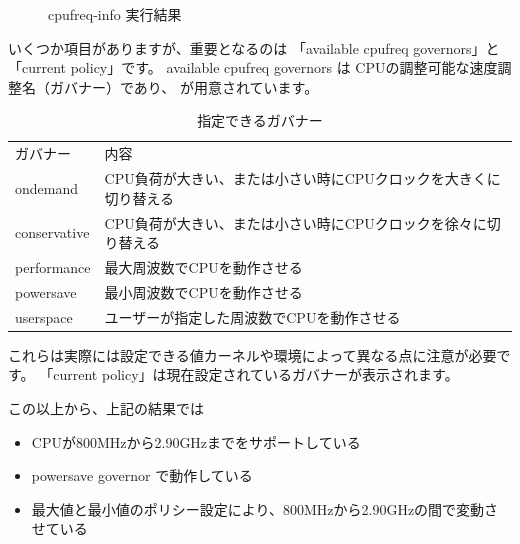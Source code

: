 \documentclass[mingoth,a4paper]{jsarticle}
\begin{document}
\begin{figure}[htbp]

\caption{cpufreq-info 実行結果}
\label{fig:cpufreq-info}
\end{figure}

いくつか項目がありますが、重要となるのは 「available cpufreq governors」と
「current policy」です。
available cpufreq governors は CPUの調整可能な速度調整名（ガバナー）であり、
が用意されています。

\begin{table}[htb]
\begin{center}
\begin{tabular}{l|l}
ガバナー & 内容 \\
ondemand &	CPU負荷が大きい、または小さい時にCPUクロックを大きくに切り替える \\
conservative &	CPU負荷が大きい、または小さい時にCPUクロックを徐々に切り替える \\
performance &	最大周波数でCPUを動作させる \\
powersave &	最小周波数でCPUを動作させる \\
userspace &	ユーザーが指定した周波数でCPUを動作させる \\
\end{tabular}
\caption{指定できるガバナー}
\label{tab:governors}
\end{center}
\end{table}

これらは実際には設定できる値カーネルや環境によって異なる点に注意が必要です。
「current policy」は現在設定されているガバナーが表示されます。

この以上から、上記の結果では

\begin{itemize}
\item CPUが800MHzから2.90GHzまでをサポートしている
\item powersave governor で動作している
\item 最大値と最小値のポリシー設定により、800MHzから2.90GHzの間で変動させている
\end{itemize}
\end{document}
